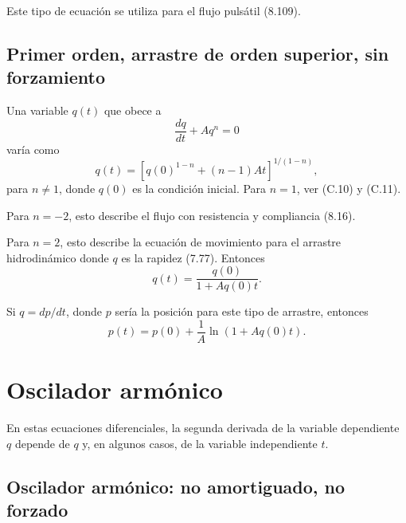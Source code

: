 \documentclass[12pt,a4paper]{book}
\begin{document}
Este tipo de ecuación se utiliza para el flujo pulsátil (8.109).

\subsection*{Primer orden, arrastre de orden superior, sin forzamiento}

Una variable $q(t)$ que obece a
\begin{equation}
\frac{dq}{dt} + Aq^n = 0
\label{eq:C.22}
\end{equation}
varía como
\begin{equation}
q(t) = \left[ q(0)^{1-n} + (n - 1)At \right]^{1/(1-n)},
\label{eq:C.23}
\end{equation}
para $n \neq 1$, donde $q(0)$ es la condición inicial. Para $n = 1$, ver (C.10) y (C.11).

Para $n = -2$, esto describe el flujo con resistencia y compliancia (8.16).

Para $n = 2$, esto describe la ecuación de movimiento para el arrastre hidrodinámico donde $q$ es la rapidez (7.77). Entonces
\begin{equation}
q(t) = \frac{q(0)}{1 + Aq(0)t}.
\label{eq:C.24}
\end{equation}

Si $q = dp/dt$, donde $p$ sería la posición para este tipo de arrastre, entonces
\begin{equation}
p(t) = p(0) + \frac{1}{A} \ln(1 + Aq(0)t).
\label{eq:C.25}
\end{equation}

\section{Oscilador armónico}\label{sec:C.3}

En estas ecuaciones diferenciales, la segunda derivada de la variable dependiente $q$ depende de $q$ y, en algunos casos, de la variable independiente $t$.

\subsection*{Oscilador armónico: no amortiguado, no forzado}
\end{document}
